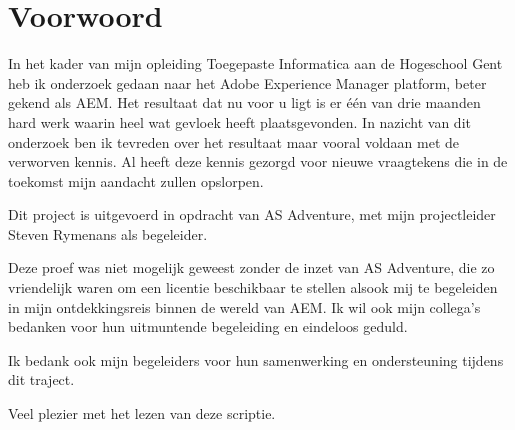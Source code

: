 \documentclass{article}
\begin{document}
	\section{Voorwoord}
	In het kader van mijn opleiding Toegepaste Informatica aan de Hogeschool Gent
	heb ik onderzoek gedaan naar het Adobe Experience Manager platform, beter gekend als AEM. 
	Het resultaat dat nu voor u ligt is er één van drie maanden hard werk waarin heel wat gevloek heeft plaatsgevonden. 
	In nazicht van dit onderzoek ben ik tevreden over het resultaat maar vooral voldaan met de verworven kennis. 
	Al heeft deze kennis gezorgd voor nieuwe vraagtekens die in de toekomst mijn aandacht zullen opslorpen.
	\par
	Dit project is uitgevoerd in opdracht van AS Adventure, met mijn projectleider Steven Rymenans als begeleider.
	\par
	Deze proef was niet mogelijk geweest zonder de inzet van AS Adventure, die zo vriendelijk waren om een licentie
	beschikbaar te stellen alsook mij te begeleiden in mijn ontdekkingsreis binnen de wereld van AEM. 
	Ik wil ook mijn collega’s bedanken voor hun uitmuntende begeleiding en eindeloos geduld.
	\par
	Ik bedank ook mijn begeleiders voor hun samenwerking en ondersteuning tijdens dit traject.
	\par
	Veel plezier met het lezen van deze scriptie.
\end{document}
